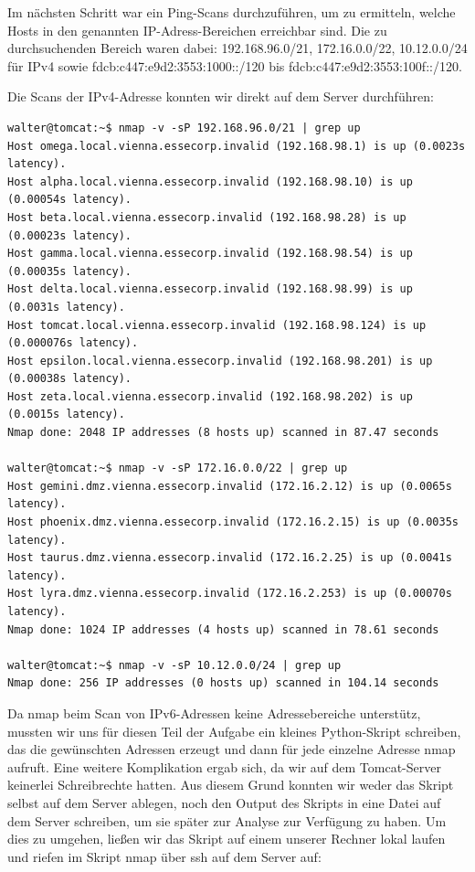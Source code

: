 Im nächsten Schritt war ein Ping-Scans durchzuführen, um zu ermitteln, welche Hosts in den genannten IP-Adress-Bereichen erreichbar sind. Die zu durchsuchenden Bereich waren dabei: 192.168.96.0/21, 172.16.0.0/22, 10.12.0.0/24 für IPv4 sowie fdcb:c447:e9d2:3553:1000::/120 bis fdcb:c447:e9d2:3553:100f::/120.

Die Scans der IPv4-Adresse konnten wir direkt auf dem Server durchführen:

\begin{lstlisting}
walter@tomcat:~$ nmap -v -sP 192.168.96.0/21 | grep up
Host omega.local.vienna.essecorp.invalid (192.168.98.1) is up (0.0023s latency).
Host alpha.local.vienna.essecorp.invalid (192.168.98.10) is up (0.00054s latency).
Host beta.local.vienna.essecorp.invalid (192.168.98.28) is up (0.00023s latency).
Host gamma.local.vienna.essecorp.invalid (192.168.98.54) is up (0.00035s latency).
Host delta.local.vienna.essecorp.invalid (192.168.98.99) is up (0.0031s latency).
Host tomcat.local.vienna.essecorp.invalid (192.168.98.124) is up (0.000076s latency).
Host epsilon.local.vienna.essecorp.invalid (192.168.98.201) is up (0.00038s latency).
Host zeta.local.vienna.essecorp.invalid (192.168.98.202) is up (0.0015s latency).
Nmap done: 2048 IP addresses (8 hosts up) scanned in 87.47 seconds

walter@tomcat:~$ nmap -v -sP 172.16.0.0/22 | grep up
Host gemini.dmz.vienna.essecorp.invalid (172.16.2.12) is up (0.0065s latency).
Host phoenix.dmz.vienna.essecorp.invalid (172.16.2.15) is up (0.0035s latency).
Host taurus.dmz.vienna.essecorp.invalid (172.16.2.25) is up (0.0041s latency).
Host lyra.dmz.vienna.essecorp.invalid (172.16.2.253) is up (0.00070s latency).
Nmap done: 1024 IP addresses (4 hosts up) scanned in 78.61 seconds

walter@tomcat:~$ nmap -v -sP 10.12.0.0/24 | grep up
Nmap done: 256 IP addresses (0 hosts up) scanned in 104.14 seconds
\end{lstlisting}

Da nmap beim Scan von IPv6-Adressen keine Adressebereiche unterstütz, mussten wir uns für diesen Teil der Aufgabe ein kleines Python-Skript schreiben, das die gewünschten Adressen erzeugt und dann für jede einzelne Adresse nmap aufruft.
Eine weitere Komplikation ergab sich, da wir auf dem Tomcat-Server keinerlei Schreibrechte hatten. Aus diesem Grund konnten wir weder das Skript selbst auf dem Server ablegen, noch den Output des Skripts in eine Datei auf dem Server schreiben, um sie später zur Analyse zur Verfügung zu haben. Um dies zu umgehen, ließen wir das Skript auf einem unserer Rechner lokal laufen und riefen im Skript nmap über ssh auf dem Server auf:

